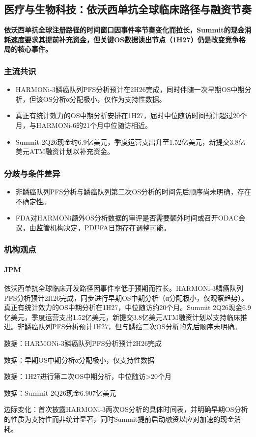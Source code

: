 \documentclass[11pt]{ctexart}
\begin{document}
\subsection{医疗与生物科技：依沃西单抗全球临床路径与融资节奏}
\textbf{依沃西单抗全球注册路径的时间窗口因事件率节奏变化而拉长，Summit的现金消耗速度要求其提前补充资金，但关键OS数据读出节点（1H27）仍是改变竞争格局的核心事件。}
\subsubsection*{主流共识}
\begin{itemize}
  \item HARMONi-3鳞癌队列PFS分析预计在2H26完成，同时伴随一次早期OS中期分析，但该OS分析α分配极小，仅作为支持性数据。
  \item 真正有统计效力的OS中期分析安排在1H27，届时中位随访时间预计超过20个月，与HARMONi-6的21个月中位随访相近。
  \item Summit 2Q26现金约6.9亿美元，季度运营支出升至1.52亿美元，新提交3.8亿美元ATM融资计划以补充资金。
\end{itemize}
\subsubsection*{分歧与条件差异}
\begin{itemize}
  \item 非鳞癌队列PFS分析与鳞癌队列第二次OS分析的时间先后顺序尚未明确，存在不确定性。
  \item FDA对HARMONi额外OS分析数据的审评是否需要额外时间或召开ODAC会议，由监管机构决定，PDUFA日期存在调整可能。
\end{itemize}
\subsubsection*{机构观点}
\paragraph{JPM} 依沃西单抗全球临床开发路径因事件率低于预期而拉长。HARMONi-3鳞癌队列PFS分析预计2H26完成，同步进行早期OS中期分析（α分配极小，仅观察趋势）。真正有统计效力的OS中期分析在1H27，中位随访约20个月。Summit 2Q26现金6.9亿美元，季度运营支出1.52亿美元，新提交3.8亿美元ATM融资计划以支持临床推进。非鳞癌队列PFS分析预计1H27，但与鳞癌二次OS分析的先后顺序未明确。
{\small\color{refgray}数据：HARMONi-3鳞癌队列PFS分析预计2H26完成\par}
{\small\color{refgray}数据：早期OS中期分析α分配极小，仅支持性数据\par}
{\small\color{refgray}数据：1H27进行第二次OS中期分析，中位随访>20个月\par}
{\small\color{refgray}数据：Summit 2Q26现金6.907亿美元\par}
{\small\color{refgray}边际变化：首次披露HARMONi-3两次OS分析的具体时间表，并明确早期OS分析的性质为支持性而非统计显著，同时Summit提前启动融资以应对加速的现金消耗。\par}
\end{document}
